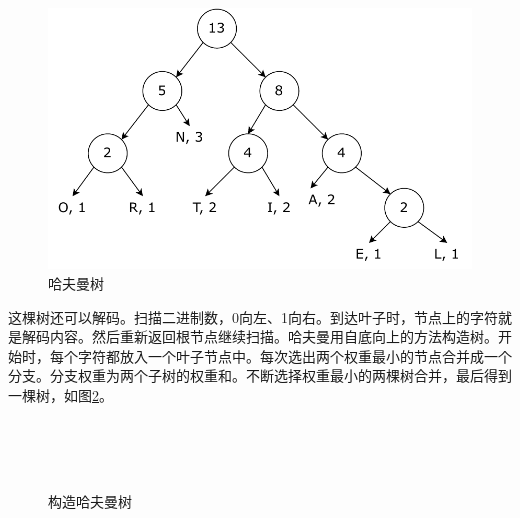 \documentclass[b5paper]{ctexart}
\begin{document}
\begin{figure}[htbp]
 \centering
 \includegraphics[scale=0.5]{img/huffman-tr}
 \caption{哈夫曼树}
 \label{fig:huffman-tr}
\end{figure}

这棵树还可以解码。扫描二进制数，0向左、1向右。到达叶子时，节点上的字符就是解码内容。然后重新返回根节点继续扫描。哈夫曼用自底向上的方法构造树。开始时，每个字符都放入一个叶子节点中。每次选出两个权重最小的节点合并成一个分支。分支权重为两个子树的权重和。不断选择权重最小的两棵树合并，最后得到一棵树，如图\ref{fig:huffman-build}。

\captionsetup[subfigure]{labelformat=empty, margin=10pt}
\begin{figure}[htbp]
 \centering
  \\
  \\
  \\
 \caption{构造哈夫曼树}
 \label{fig:huffman-build}
\end{figure}
\captionsetup[subfigure]{labelformat=parens}
\end{document}
